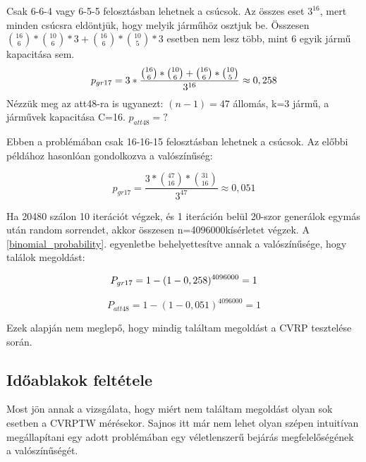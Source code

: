 Csak 6-6-4 vagy 6-5-5 felosztásban lehetnek a csúcsok. Az összes eset \(3^{16}\), mert minden csúcsra eldöntjük, hogy melyik járműhöz osztjuk be. Összesen \(\binom{16}{6}*\binom{10}{6}*3 + \binom{16}{6}*\binom{10}{5}*3 \) esetben nem lesz több, mint 6 egyik jármű kapacitása sem.
\begin{equation}
	p_{gr17} = 3*\frac{\binom{16}{6}*\binom{10}{6} + \binom{16}{6}*\binom{10}{5}}{3^{16}} \approx 0,258
	\label{gr17_p}
\end{equation}
Nézzük meg az att48-ra is ugyanezt: \((n-1)=47\) állomás, k=3 jármű, a járművek kapacitása C=16. \(p_{att48}=?\)

\newcommand{\patt}{0,051}

Ebben a problémában csak 16-16-15 felosztásban lehetnek a csúcsok. Az előbbi példához hasonlóan gondolkozva a valószínűség:

\begin{equation}
	p_{gr17} = \frac{3*\binom{47}{16}*\binom{31}{16}}{3^{47}} \approx \patt
	\label{att48_p}
\end{equation}

\newcommand{\nInTenIterations}{4096000}

Ha 20480 szálon 10 iterációt végzek, és 1 iteráción belül 20-szor generálok egymás után random sorrendet, akkor összesen n=\nInTenIterations kísérletet végzek. A \ref{binomial_probability}. egyenletbe behelyettesítve annak a valószínűsége, hogy találok megoldást:

\begin{equation}
	P_{gr17} = 1-(1-\pgr)^{\nInTenIterations} = 1
	\label{gr17_P}
\end{equation}

\begin{equation}
	P_{att48} = 1-(1-\patt)^{\nInTenIterations} = 1
	\label{att48_P}
\end{equation}

Ezek alapján nem meglepő, hogy mindig találtam megoldást a CVRP tesztelése során.

\subsection{Időablakok feltétele}
Most jön annak a vizsgálata, hogy miért nem találtam megoldást olyan sok esetben a CVRPTW mérésekor. Sajnos itt már nem lehet olyan szépen intuitívan megállapítani egy adott problémában egy véletlenszerű bejárás megfelelőségének a valószínűségét. 